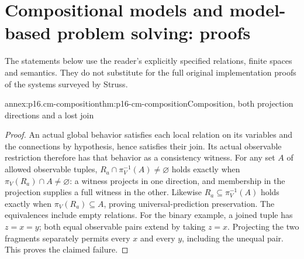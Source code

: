 \section{Compositional models and model-based problem solving: proofs}
\label{sec:annex-p16-qualitative-compositional-model-formulation}

The statements below use the reader's explicitly specified relations,
finite spaces and semantics. They do not substitute for the full original
implementation proofs of the systems surveyed by Struss.

\begin{annexitem}{annex:p16.cm-composition}{thm:p16-cm-composition}{Composition, both projection directions and a lost join}
\begin{proof}
An actual global behavior satisfies each local relation on its variables
and the connections by hypothesis, hence satisfies their join. Its actual
observable restriction therefore has that behavior as a consistency witness.
For any set \(A\) of allowed observable tuples,
\(R_a\cap\pi_V^{-1}(A)\ne\varnothing\) holds exactly when
\(\pi_V(R_a)\cap A\ne\varnothing\): a witness projects in one direction,
and membership in the projection supplies a full witness in the other.
Likewise \(R_a\subseteq\pi_V^{-1}(A)\) holds exactly when
\(\pi_V(R_a)\subseteq A\), proving universal-prediction preservation.
The equivalences include empty relations. For the binary example, a joined
tuple has \(z=x=y\); both equal observable pairs extend by taking \(z=x\).
Projecting the two fragments separately permits every \(x\) and every
\(y\), including the unequal pair. This proves the claimed failure.
\end{proof}
\end{annexitem}

